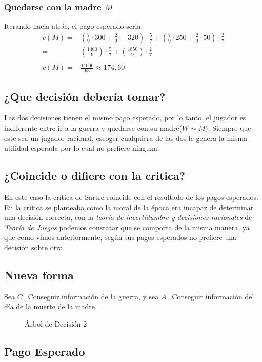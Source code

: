 \documentclass[12pt]{article}
\begin{document}
\subsubsection{Quedarse con la madre $M$}
Iterando hacia atrás, el pago esperado seria: 
\begin{align*}
    v(M)=&(\frac{7}{9}\cdot300+\frac{2}{9}\cdot -320)\cdot \frac{5}{7}+(\frac{7}{9}\cdot250+\frac{2}{9}\cdot 50)\cdot \frac{2}{7}\\
    =&(\frac{1460}{9})\cdot \frac{5}{7}+(\frac{1850}{9})\cdot \frac{2}{7}\\\\
   v(M) =& \frac{11000}{63} \approx 174,60
\end{align*}
\subsection{¿Que decisión debería tomar?}
Las dos decisiones tienen el mismo pago esperado, por lo tanto, el jugador es indiferente entre ir a la guerra y quedarse con su madre($W\sim M$). Siempre que este sea un jugador racional, escoger cualquiera de las dos le genera la misma utilidad esperada por lo cual no prefiere ninguna. 
\subsection{¿Coincide o difiere con la critica?}
En este caso la crítica de Sartre coincide con el resultado de los pagos esperados. En la crítica se planteaba como la moral de la época era incapaz de determinar una decisión correcta, con la \textit{teoría de incertidumbre y decisiones racionales} de \textit{Teoría de Juegos} podemos constatar que se comporta de la misma manera, ya que como vimos anteriormente, según sus pagos esperados no prefiere una decisión sobre otra. 
\subsection{Nueva forma}
Sea $C$=Conseguir información de la guerra, y sea $A$=Conseguir información del día de la muerte de la madre. 
\begin{figure} [H]
    \centering
    
    \caption{Árbol de Decisión 2}
    \label{fig:placeholder}
\end{figure}
\subsection{Pago Esperado}
\end{document}
